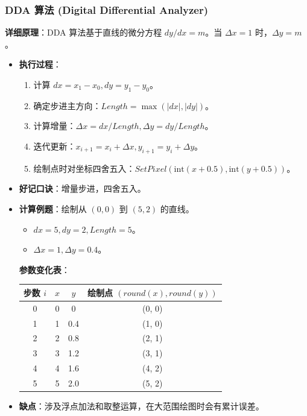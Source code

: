 \documentclass[UTF8]{ctexart}
\begin{document}
\subsubsection{DDA 算法 (Digital Differential Analyzer)}
\textbf{详细原理}：DDA 算法基于直线的微分方程 $dy/dx = m$。当 $\Delta x = 1$ 时，$\Delta y = m$。
\begin{itemize}
    \item \textbf{执行过程}：
        \begin{enumerate}
            \item 计算 $dx = x_1 - x_0, dy = y_1 - y_0$。
            \item 确定步进主方向：$Length = \max(|dx|, |dy|)$。
            \item 计算增量：$\Delta x = dx/Length, \Delta y = dy/Length$。
            \item 迭代更新：$x_{i+1} = x_i + \Delta x, y_{i+1} = y_i + \Delta y$。
            \item 绘制点时对坐标四舍五入：$SetPixel(\text{int}(x+0.5), \text{int}(y+0.5))$。
        \end{enumerate}
    \item \textbf{好记口诀}：增量步进，四舍五入。
    \item \textbf{计算例题}：绘制从 $(0,0)$ 到 $(5,2)$ 的直线。
        \begin{itemize}
            \item $dx=5, dy=2, Length=5$。
            \item $\Delta x = 1, \Delta y = 0.4$。
        \end{itemize}
        \textbf{参数变化表}：
        \begin{center}
        \begin{tabular}{|c|c|c|c|}
            \hline
            步数 $i$ & $x$ & $y$ & 绘制点 $(round(x), round(y))$ \\
            \hline
            0 & 0 & 0 & (0, 0) \\
            1 & 1 & 0.4 & (1, 0) \\
            2 & 2 & 0.8 & (2, 1) \\
            3 & 3 & 1.2 & (3, 1) \\
            4 & 4 & 1.6 & (4, 2) \\
            5 & 5 & 2.0 & (5, 2) \\
            \hline
        \end{tabular}
        \end{center}
    \item \textbf{缺点}：涉及浮点加法和取整运算，在大范围绘图时会有累计误差。

\end{itemize}
\end{document}
